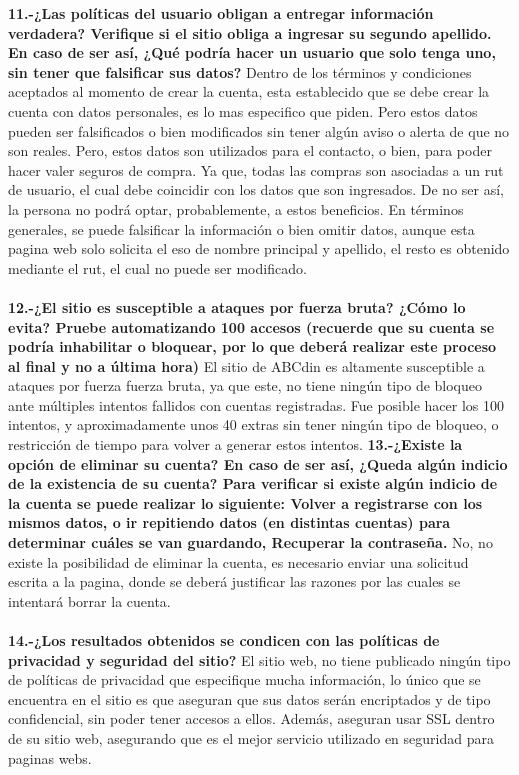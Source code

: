 \documentclass{article}
\begin{document}
\textbf{11.-¿Las políticas del usuario obligan a entregar información verdadera? Verifique si el sitio obliga a ingresar su segundo apellido. En caso de ser así, ¿Qué podría hacer un usuario que solo tenga uno, sin tener que falsificar sus datos?} \newline
Dentro de los términos y condiciones aceptados al momento de crear la cuenta, esta establecido que se debe crear la cuenta con datos personales, es lo mas especifico que piden. Pero estos datos pueden ser falsificados o bien modificados sin tener algún aviso
o alerta de que no son reales. Pero, estos datos son utilizados para el contacto, o bien, para poder hacer valer seguros de compra. Ya que, todas las compras son asociadas a un rut de usuario, el cual debe coincidir con los 
datos que son ingresados. 
De no ser así, la persona no podrá optar, probablemente, a estos beneficios.
En términos generales, se puede falsificar la información o bien omitir datos, aunque esta pagina web solo solicita el eso de nombre principal
y apellido, el resto es obtenido mediante el rut, el cual no puede ser modificado. 
\\\\
\textbf{12.-¿El sitio es susceptible a ataques por fuerza bruta? ¿Cómo lo evita? Pruebe automatizando 100 accesos (recuerde que su cuenta se podría inhabilitar o bloquear, por lo que deberá realizar este proceso al final y no a última hora)}
\newline
El sitio de ABCdin es altamente susceptible a ataques por fuerza fuerza bruta, ya que este, no tiene ningún tipo de bloqueo ante múltiples intentos fallidos con cuentas registradas. \newline
Fue posible hacer los 100 intentos, y aproximadamente unos 40 extras sin tener ningún tipo de bloqueo, o restricción de tiempo para volver a generar estos intentos. 
\newpage
\textbf{13.-¿Existe la opción de eliminar su cuenta? En caso de ser así, ¿Queda algún indicio de la existencia de su cuenta? Para verificar si existe algún indicio de la cuenta se puede realizar lo siguiente:  Volver a registrarse con los mismos datos, o ir repitiendo datos (en distintas cuentas) para determinar cuáles se van guardando, Recuperar la contraseña.}
No, no existe la posibilidad de eliminar la cuenta, es necesario enviar una solicitud escrita a la pagina, donde se deberá justificar las razones por las cuales se intentará borrar la cuenta.
\\\\
\textbf{14.-¿Los resultados obtenidos se condicen con las políticas de privacidad y seguridad del sitio?}
\newline
El sitio web, no tiene publicado ningún tipo de políticas de privacidad que especifique mucha información, lo único que se encuentra en el sitio 
es que aseguran que sus datos serán encriptados y de tipo confidencial, sin poder tener accesos a ellos. Además, aseguran usar SSL dentro de su sitio web, asegurando que es el mejor servicio utilizado en seguridad para paginas webs. 
\end{document}
